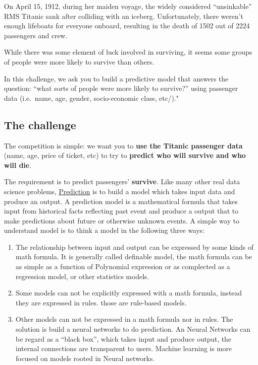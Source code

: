 \documentclass[
]{book}
\providecommand{\tightlist}{%
  \setlength{\itemsep}{0pt}\setlength{\parskip}{0pt}}
\begin{document}
On April 15, 1912, during her maiden voyage, the widely considered ``unsinkable'' RMS Titanic sank after colliding with an iceberg. Unfortunately, there weren't enough lifeboats for everyone onboard, resulting in the death of 1502 out of 2224 passengers and crew.

While there was some element of luck involved in surviving, it seems some groups of people were more likely to survive than others.

In this challenge, we ask you to build a predictive model that answers the question: ``what sorts of people were more likely to survive?'' using passenger data (i.e.~name, age, gender, socio-economic class, etc/)."

\hypertarget{the-challenge}{%
\subsection*{The challenge}\label{the-challenge}}


The competition is simple: we want you to \textbf{use the Titanic passenger data} (name, age, price of ticket, etc) to try to \textbf{predict who will survive and who will die}.

The requirement is to predict passengers' \textbf{survive}. Like many other real data science problems, \protect\hyperlink{predictive}{Prediction} is to build a model which takes input data and produce an output. A prediction model is a mathematical formula that takes input from historical facts reflecting past event and produce a output that to make predictions about future or otherwise unknown events. A simple way to understand model is to think a model in the following three ways:

\begin{enumerate}
\def\labelenumi{\arabic{enumi}.}
\tightlist
\item
  The relationship between input and output can be expressed by some kinds of math formula. It is generally called definable model, the math formula can be as simple as a function of Polynomial expression or as complected as a regression model, or other statistics models.
\item
  Some models can not be explicitly expressed with a math formula, instead they are expressed in rules. those are rule-based models.
\item
  Other models can not be expressed in a math formula nor in rules. The solution is build a neural networks to do prediction. An Neural Networks can be regard as a ``black box'', which takes input and produce output, the internal connections are transparent to users. Machine learning is more focused on models rooted in Neural networks.
\end{enumerate}
\end{document}
